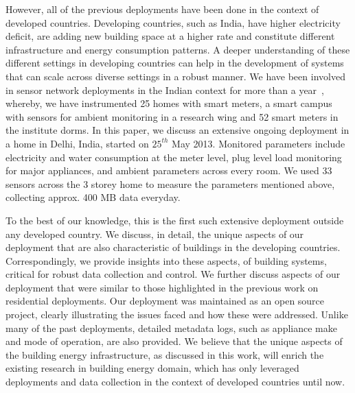 \documentclass[10pt]{sensys-proc}
\newcommand{\redcolor}[1]{\textcolor{red}{#1}}
\begin{document}
 However, all of the previous deployments have been done in the context of developed countries. Developing countries, such as India, have higher electricity deficit, are adding new building space at a higher rate and constitute different infrastructure and energy consumption patterns. A deeper understanding of these different settings in developing countries can help in the development of systems that can scale across diverse settings in a robust manner. %
We have been involved in sensor network deployments in the Indian context for more than a year~\cite{batra}, whereby, we have instrumented 25 homes with smart meters, a smart campus with sensors for ambient monitoring in a research wing and 52 smart meters in the institute dorms. In this paper, we discuss an extensive ongoing deployment in a home in Delhi, India, started on $25^{th}$ May 2013. Monitored parameters include electricity and water consumption at the meter level, plug level load monitoring for major appliances, and ambient parameters across every room. We used 33 sensors across the 3 storey home to measure the parameters mentioned above, collecting approx. 400 MB data everyday.%

 To the best of our knowledge, this is the first such extensive deployment outside any developed country. We discuss, in detail, the unique aspects of our deployment that are also characteristic of buildings in the developing countries. Correspondingly, we provide insights into these aspects, of building systems, critical for robust data collection and control. We further discuss aspects of our deployment that were similar to those highlighted in the previous work on residential deployments. Our deployment was maintained as an open source project, clearly illustrating the issues faced and how these were addressed. Unlike many of the past deployments, detailed metadata logs, such as appliance make and mode of operation, are also provided. We believe that the unique aspects of the building energy infrastructure, as discussed in this work, will enrich the existing research in building energy domain, which has only leveraged deployments and data collection in the context of developed countries until now. %
\end{document}
